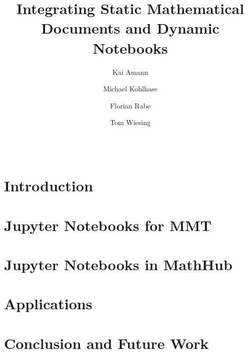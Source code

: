 \documentclass{llncs}
\title{Integrating Static Mathematical Documents and Dynamic Notebooks}
\author{Kai Amann \and Michael Kohlhase \and Florian Rabe \and Tom Wiesing}
\institute{Computer Science, FAU Erlangen-N\"urnberg}
\begin{document}
\maketitle
\begin{abstract}\strut\\\end{abstract}


\section{Introduction}\label{sec:intro}


\section{Jupyter Notebooks for MMT}\label{sec:mmt-jp}


\section{Jupyter Notebooks in MathHub}\label{sec:nb-mh}


\section{Applications}\label{sec:mitm-nb}


\section{Conclusion and Future Work}\label{sec:concl}


\printbibliography
\end{document}
